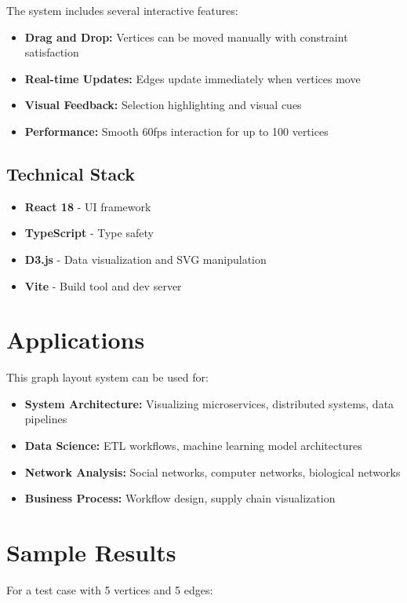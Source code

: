 \documentclass[11pt]{article}
\begin{document}
The system includes several interactive features:
\begin{itemize}
\item \textbf{Drag and Drop:} Vertices can be moved manually with constraint satisfaction
\item \textbf{Real-time Updates:} Edges update immediately when vertices move
\item \textbf{Visual Feedback:} Selection highlighting and visual cues
\item \textbf{Performance:} Smooth 60fps interaction for up to 100 vertices
\end{itemize}

\subsection{Technical Stack}

\begin{itemize}
\item \textbf{React 18} - UI framework
\item \textbf{TypeScript} - Type safety
\item \textbf{D3.js} - Data visualization and SVG manipulation
\item \textbf{Vite} - Build tool and dev server
\end{itemize}

\section{Applications}

This graph layout system can be used for:

\begin{itemize}
\item \textbf{System Architecture:} Visualizing microservices, distributed systems, data pipelines
\item \textbf{Data Science:} ETL workflows, machine learning model architectures
\item \textbf{Network Analysis:} Social networks, computer networks, biological networks
\item \textbf{Business Process:} Workflow design, supply chain visualization
\end{itemize}

\section{Sample Results}

For a test case with 5 vertices and 5 edges:
\end{document}
